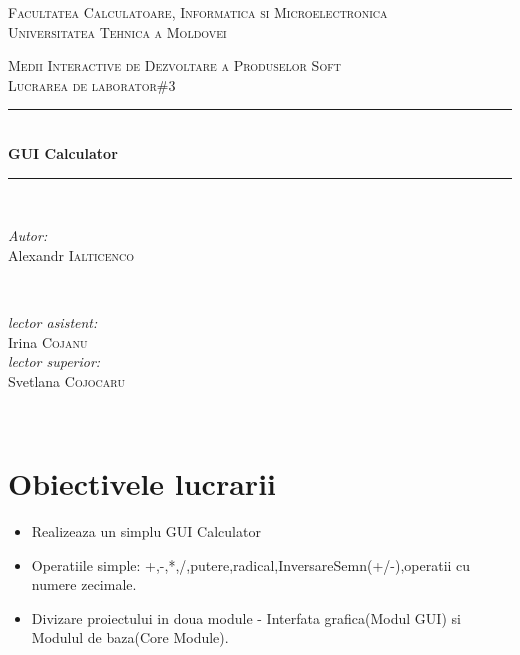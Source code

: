\documentclass[12pt]{article}
\begin{document}
\begin{titlepage}
\begin{center} 
 \textsc{\large Facultatea Calculatoare, Informatica si Microelectronica}\\[0.5cm]
\textsc{\large Universitatea Tehnica a Moldovei}\\[1.2cm] 
\vspace{25 mm}

\textsc{\Large Medii Interactive de Dezvoltare a Produselor Soft}\\[0.5cm] 
\textsc{\large Lucrarea de laborator\#3}\\[0.5cm] \newcommand{\HRule}{\rule{\linewidth}{0.5mm}} 
  \vspace{10 mm}
  \HRule \\[0.4cm]
  { \LARGE \bfseries GUI Calculator  }\\[0.4cm] 
  \HRule \\[1.5cm]
      \vspace{30mm}

      \begin{minipage}{0.4\textwidth}
      \begin{flushleft} \large
      \emph{Autor:}\\
      Alexandr \textsc{Ialticenco}
      \end{flushleft}
      \end{minipage}
      ~
      \begin{minipage}{0.4\textwidth}
      \begin{flushright} \large
      \emph{lector asistent:} \\
      Irina \textsc{Cojanu} \\ 
      \emph{lector superior:} \\
      Svetlana \textsc{Cojocaru} 
      \end{flushright}
      \end{minipage}\\[4cm]

      \vspace{5 mm}

      \vfill
      \end{center}
      
\end{titlepage}

\section*{Obiectivele lucrarii}
\begin{itemize}
\item Realizeaza un simplu GUI Calculator
\item Operatiile simple: +,-,*,/,putere,radical,InversareSemn(+/-),operatii cu numere zecimale.
\item Divizare proiectului in doua module - Interfata grafica(Modul GUI) si Modulul de baza(Core Module).
\end{itemize}
\end{document}
